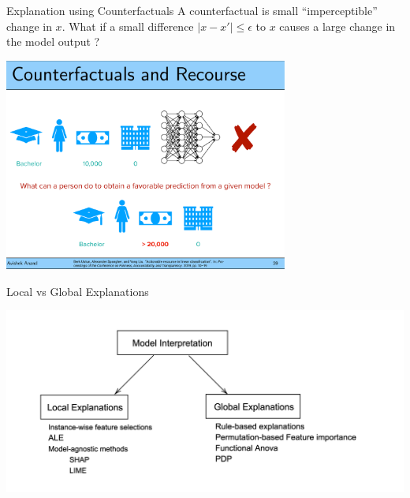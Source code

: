 \documentclass[11pt,compress,t,notes=noshow, xcolor=table]{beamer}
\begin{document}
\begin{vbframe}{Explanation using Counterfactuals}
    A counterfactual is small ``imperceptible'' change in $x$. What if a small difference $ |x - x'| \leq \epsilon$ to $x$ causes a large change in the model output ?
	\begin{center}
		\includegraphics[page=1, width=0.7\textwidth]{figure/counterfactual.pdf}
	\end{center}
	
\end{vbframe}

\begin{vbframe}{Local vs Global Explanations}
	\begin{center}
		\includegraphics[width=\textwidth]{figure/1-local-global.png}
	\end{center}
\end{vbframe}
\end{document}
